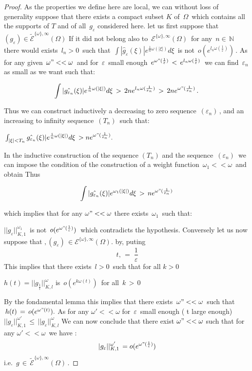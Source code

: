 \documentclass[12pt,a4paper]{amsart}
\newcommand{\NN}{\mathbb N}
\begin{document}
\begin{proof}
As the properties we define here are local, we can without loss of generality suppose that there exists a compact subset $K$ of 
$\,\Omega\,$ which contains all the supports of $T$ and of all $\,g_\varepsilon$ considered here.
 let us first suppose that
  $(g_\varepsilon)\in \tilde{\mathcal{E}}^{\{\omega\},\infty}(\Omega)$
  If it did not belong also to 
  $\,\mathcal{E}^{\{\omega\},\infty}(\Omega)\,$ for  any 
  $\,n\in\,\NN$ there would exists $\,l_n>0\,$ such that 
$\,\int|\hat{g}_\varepsilon(\xi)|e^{\frac{1}{n}\omega(|\xi|)}d\xi\,$ is not
 $\,o(e^{l_n\omega(\frac{1}{\varepsilon})})\,$. 
 As for any given $\,\omega"<<\omega\,$
 and for $\,\varepsilon\,$ small enough 
 $\,e^{\omega"(\frac{1}{\varepsilon})}\,<\,e^{l_n\omega(\frac{1}{\varepsilon})} \,$ we can find 
 $\,\varepsilon_n$ as small as we want such that:
 
$$ \int|\hat{g_{\varepsilon_n}}(\xi)|e^{\frac{1}{n}\omega(|\xi|)}d\xi \,>\,
2ne^{l_n\omega(\frac{1}{\varepsilon_n})}\,>\,2ne^{\omega"(\frac{1}{\varepsilon_n})}\,. $$

Thus we can construct inductively a decreasing to zero sequence $\,(\varepsilon_n)\,$, and an increasing to infinity sequence $\,(T_n)\,$ such that:
   
  $\,\int_{|\xi|<T_n}\hat{g_{\varepsilon_n}}(\xi)|e^{\frac{1}{n}\omega(|\xi|)}d\xi\, 
  > ne^{\omega"(\frac{1}{\varepsilon_n})}.$
  
  In the inductive construction of the sequence $(T_n)$ and the sequence $\,(\varepsilon_n)\,$ 
  we can impose the condition of the construction of a weight function $\,\omega_1<<\omega\,$ and obtain 
   Thus
   
$$\int|\hat{g_{\varepsilon_n}}(\xi)|e^{\omega_1(|\xi|)}d\xi\,>\, ne^{\omega"(\frac{1}{\varepsilon_n})} $$

which implies that for any $\omega"<<\omega$ there exists 
$\,\omega_1\,$ such that:
 
$||g_{\varepsilon}||_ {K,1}^{\omega_1}\,$ is not $\,o(e^{\omega"(\frac{1}{\varepsilon})})\,$
which contradicts the hypothesis.
Conversely let us now suppose that 
$,(g_\varepsilon) \,
\in \mathcal{E}^{\{\omega\},\infty}(\Omega).$ by, puting 
$$\,t,\,=\; \frac{1}{\varepsilon}$$
This implies that there exists $\,l>0\,$ such that for all $k>0$

$ h(t) = ||g_{\frac{1}{t}}||_{K,l}^\omega $ is
 $\,o(e^{k\omega(t)})\,$ for all $\,k\,>\,0\,$
 
 By the fondamental lemma this implies
  that there exists $\,\omega"<<\omega\,$ such that
  $\,h(t) \,=\,o(e^{\omega"(t)} )  .$ 
  As for any 
  $\omega'<<\omega$ for $\,\varepsilon\,$ small enough ( t large enough)
  $||g_\varepsilon||_{K,1}^{\omega'} \,
  \leq\,||g_\varepsilon||_{K,l}^{\omega}$
  We can  now conclude that 
  there exist $\omega"<<\omega$ such that for any
   $\omega'<<\omega\,$
   we have :
   $$\,|g_{\varepsilon}||_ {K,1}^{\omega'}\,=
   o(e^{\omega"(\frac{1}{\varepsilon})})$$
   i.e. $\,g\,\in\,\tilde{\mathcal{E}}^{\{\omega\},\infty}(\Omega)\,$.
   \end{proof}
   
\end{document}

